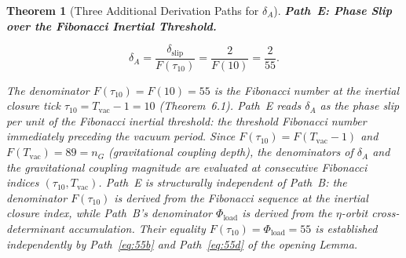 \documentclass[11pt, letterpaper]{article}
\newcommand{\aop}{\eta}
\theoremstyle{definition}
\theoremstyle{plain}
\newtheorem{theorem}{Theorem}[section]
\begin{document}
\begin{theorem}[Three Additional Derivation Paths for $\delta_A$]
\medskip
\noindent\textbf{Path~E: Phase Slip over the Fibonacci Inertial Threshold.}

\begin{equation}
    \delta_A = \frac{\delta_\mathrm{slip}}{F(\tau_{10})} = \frac{2}{F(10)} = \frac{2}{55}.
    \label{eq:pathE}
\end{equation}

The denominator $F(\tau_{10}) = F(10) = 55$ is the Fibonacci number at the inertial
closure tick $\tau_{10} = T_\mathrm{vac} - 1 = 10$ (Theorem~6.1). Path~E reads
$\delta_A$ as the phase slip per unit of the \emph{Fibonacci inertial threshold}: the
threshold Fibonacci number immediately preceding the vacuum period. Since
$F(\tau_{10}) = F(T_\mathrm{vac} - 1)$ and $F(T_\mathrm{vac}) = 89 = n_G$
(gravitational coupling depth), the denominators of $\delta_A$ and the gravitational
coupling magnitude are evaluated at consecutive Fibonacci indices $(\tau_{10},
T_\mathrm{vac})$. Path~E is structurally independent of Path~B: the denominator
$F(\tau_{10})$ is derived from the Fibonacci sequence at the inertial closure index,
while Path~B's denominator $\Phi_\mathrm{load}$ is derived from the $\aop$-orbit
cross-determinant accumulation. Their equality $F(\tau_{10}) = \Phi_\mathrm{load} = 55$
is established independently by Path~\eqref{eq:55b} and Path~\eqref{eq:55d} of the
opening Lemma.
\end{theorem}
\end{document}

